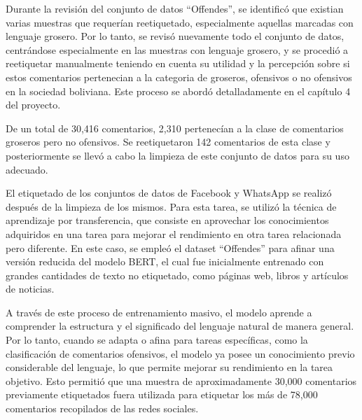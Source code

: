 Durante la revisión del conjunto de datos ``Offendes'', se identificó que existian varias muestras que requerían reetiquetado, especialmente aquellas marcadas con lenguaje grosero. Por lo tanto, se revisó nuevamente todo el conjunto de datos, centrándose especialmente en las muestras con lenguaje grosero, y se procedió a reetiquetar manualmente teniendo en cuenta su utilidad y la percepción sobre si estos comentarios pertenecian a la categoria de groseros, ofensivos o no ofensivos en la sociedad boliviana. Este proceso se abordó detalladamente en el capítulo 4 del proyecto.

De un total de 30,416 comentarios, 2,310 pertenecían a la clase de comentarios groseros pero no ofensivos. Se reetiquetaron 142 comentarios de esta clase y posteriormente se llevó a cabo la limpieza de este conjunto de datos para su uso adecuado.

El etiquetado de los conjuntos de datos de Facebook y WhatsApp se realizó después de la limpieza de los mismos. Para esta tarea, se utilizó la técnica de aprendizaje por transferencia, que consiste en aprovechar los conocimientos adquiridos en una tarea para mejorar el rendimiento en otra tarea relacionada pero diferente. En este caso, se empleó el dataset ``Offendes'' para afinar una versión reducida del modelo BERT, el cual fue inicialmente entrenado con grandes cantidades de texto no etiquetado, como páginas web, libros y artículos de noticias.

A través de este proceso de entrenamiento masivo, el modelo aprende a comprender la estructura y el significado del lenguaje natural de manera general. Por lo tanto, cuando se adapta o afina para tareas específicas, como la clasificación de comentarios ofensivos, el modelo ya posee un conocimiento previo considerable del lenguaje, lo que permite mejorar su rendimiento en la tarea objetivo. Esto permitió que una muestra de aproximadamente 30,000 comentarios previamente etiquetados fuera utilizada para etiquetar los más de 78,000 comentarios recopilados de las redes sociales.

